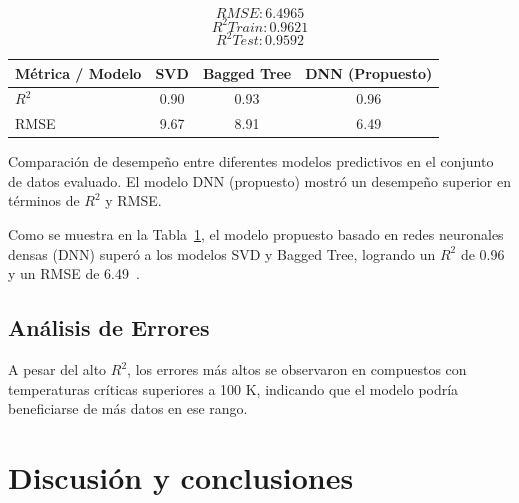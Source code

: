\documentclass[conference]{IEEEtran} %
\begin{document}
$$RMSE: 6.4965$$
$$R^2 Train: 0.9621$$
$$R^2 Test: 0.9592$$

\begin{table}[!h]
    \centering
    \begin{tabular}{|l|c|c|c|}
    \hline
    \textbf{Métrica / Modelo} & \textbf{SVD} & \textbf{Bagged Tree} & \textbf{DNN (Propuesto)} \\ \hline
    $R^2$                     & 0.90         & 0.93                 & 0.96                     \\ 
    RMSE                      & 9.67         & 8.91                 & 6.49                     \\ 
    \hline
    \end{tabular}
    \label{tab:comp}
\end{table}
Comparación de desempeño entre diferentes modelos predictivos en el conjunto de datos evaluado. El modelo DNN (propuesto) mostró un desempeño superior en términos de $R^2$ y RMSE.

Como se muestra en la Tabla~\ref{tab:comp}, el modelo propuesto basado en 
redes neuronales densas (DNN) superó a los modelos SVD y Bagged Tree, 
logrando un $R^2$ de 0.96 y un RMSE de 6.49~\cite{roter2020predicting}.

\subsection{Análisis de Errores}
A pesar del alto $R^2$, los errores más altos se observaron en compuestos 
con temperaturas críticas superiores a 100 K, indicando que el modelo 
podría beneficiarse de más datos en ese rango.

\section{Discusión y conclusiones}
\end{document}
